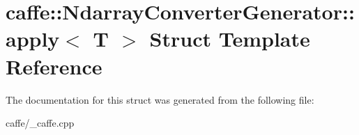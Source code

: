 \hypertarget{structcaffe_1_1_ndarray_converter_generator_1_1apply}{}\section{caffe\+:\+:Ndarray\+Converter\+Generator\+:\+:apply$<$ T $>$ Struct Template Reference}
\label{structcaffe_1_1_ndarray_converter_generator_1_1apply}


The documentation for this struct was generated from the following file\+:\begin{DoxyCompactItemize}
\item 
caffe/\+\_\+caffe.\+cpp\end{DoxyCompactItemize}
